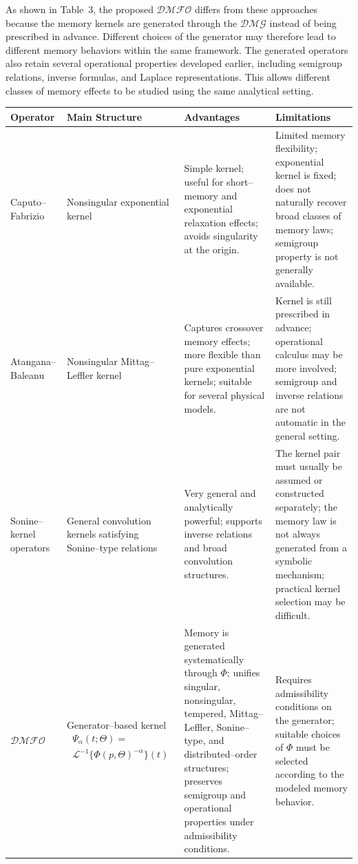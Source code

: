 \documentclass[11pt]{article}
\numberwithin{equation}{section}
\begin{document}
As shown in Table~3, the proposed $\mathcal{DMFO}$ differs from these approaches because the memory kernels are generated through the $\mathcal{DMG}$
instead of being prescribed in advance. Different choices of the generator may therefore lead to different memory behaviors within the same framework.
The generated operators also retain several operational properties developed earlier, including semigroup relations, inverse formulas, and Laplace representations. This allows different classes of memory effects to be studied using the same analytical setting.

\begin{table}[h!]
\centering
\scriptsize
\renewcommand{\arraystretch}{1.25}
\begin{tabular}{|p{2.7cm}|p{3.2cm}|p{3.6cm}|p{3.6cm}|}
\hline
\textbf{Operator} &
\textbf{Main Structure} &
\textbf{Advantages} &
\textbf{Limitations}
\\
\hline

Caputo--Fabrizio &
Nonsingular exponential kernel &
Simple kernel; useful for short--memory and exponential relaxation effects; avoids singularity at the origin. &
Limited memory flexibility; exponential kernel is fixed; does not naturally recover broad classes of memory laws; semigroup property is not generally available.
\\
\hline

Atangana--Baleanu &
Nonsingular Mittag--Leffler kernel &
Captures crossover memory effects; more flexible than pure exponential kernels; suitable for several physical models. &
Kernel is still prescribed in advance; operational calculus may be more involved; semigroup and inverse relations are not automatic in the general setting.
\\
\hline

Sonine--kernel operators &
General convolution kernels satisfying Sonine--type relations &
Very general and analytically powerful; supports inverse relations and broad convolution structures. &
The kernel pair must usually be assumed or constructed separately; the memory law is not always generated from a symbolic mechanism; practical kernel selection may be difficult.
\\
\hline

 $\mathcal{DMFO}$  &
Generator--based kernel
\begin{align*}
\Psi_\alpha(t;\Theta)
=\\
\mathcal L^{-1}
\{\Phi(p,\Theta)^{-\alpha}\}(t)
\end{align*}
&
Memory is generated systematically through \(\Phi\); unifies singular, nonsingular, tempered, Mittag--Leffler, Sonine--type, and distributed--order structures; preserves semigroup and operational properties under admissibility conditions. &
Requires admissibility conditions on the generator; suitable choices of \(\Phi\) must be selected according to the modeled memory behavior.
\\
\hline
\end{tabular}


\end{table}
\end{document}
